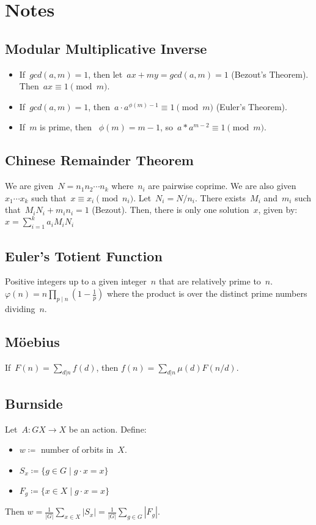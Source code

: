 \section{Notes}
\subsection{Modular Multiplicative Inverse}
\begin{itemize}
\item If~$gcd(a, m) = 1$, then let~$ax + my = gcd(a, m) = 1$ (Bezout's Theorem). Then~$ax \equiv 1{\pmod {m}}$.
\item If~$gcd(a, m) = 1$, then~$a \cdot a^{\phi (m)-1}\equiv 1{\pmod {m}}$ (Euler's Theorem).
\item If~$m$ is prime, then ~$\phi (m) = m - 1$, so~$a * a^{m - 2} \equiv 1 {\pmod {m}}$.
\end{itemize}

\subsection{Chinese Remainder Theorem}
We are given~$N = n_1 n_2 \cdots n_k$ where~$n_i$ are pairwise coprime. We are also given~$x_1 \cdots x_k$ such that~$x \equiv x_i {\pmod {n_i}}$.
Let~$N_i = N/n_i$. There exists~$M_i$ and~$m_i$ such that~$M_i N_i + m_i n_i = 1$ (Bezout). Then, there is only one solution~$x$, given by:
$x=\sum\limits_{i=1}^{k}a_{i}M_{i}N_{i}$

\subsection{Euler's Totient Function}
Positive integers up to a given integer~$n$ that are relatively prime to~$n$.
$\varphi (n)=n\prod\limits_{p\mid n}\left(1-{\frac {1}{p}}\right)$ where the product is over the distinct prime numbers dividing~$n$.

\subsection{Möebius}
If~$F(n) = \sum\limits_{d | n}{f(d)}$, then
$f(n) = \sum\limits_{d | n}{\mu(d) F(n / d)}.$

\subsection{Burnside}
Let~$A \colon GX \rightarrow X$ be an action. Define:
\begin{itemize}
\item $w \coloneqq $ number of orbits in~$X$.
\item $S_x \coloneqq \{g \in G \mid g \cdot x = x \}$
\item $F_g \coloneqq \{x \in X \mid g \cdot x = x \} $
\end{itemize}
Then $ w = \frac{1}{|G|} \sum\limits_{x \in X}{|S_x|} = \frac{1}{|G|} \sum\limits_{g \in G}{|F_g|}. $

